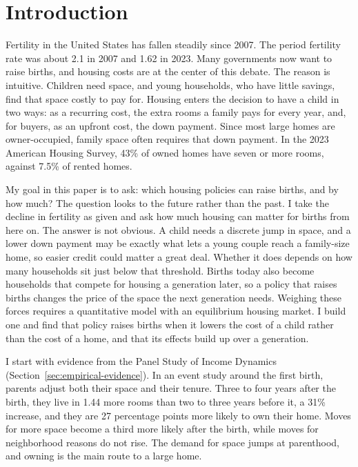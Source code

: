 \section{Introduction}
\label{sec:intro}

Fertility in the United States has fallen steadily since 2007. The period
fertility rate was about 2.1 in 2007 and 1.62 in 2023. Many governments now
want to raise births, and housing costs are at the center of this debate. The
reason is intuitive. Children need space, and young households, who have
little savings, find that space costly to pay for. Housing enters the
decision to have a child in two ways: as a recurring cost, the extra rooms a
family pays for every year, and, for buyers, as an upfront cost, the down
payment. Since most large homes are owner-occupied, family space often
requires that down payment. In the 2023 American Housing Survey, 43\% of
owned homes have seven or more rooms, against 7.5\% of rented homes.

My goal in this paper is to ask: which housing policies can raise births, and
by how much? The question looks to the future rather than the past. I take
the decline in fertility as given and ask how much housing can matter for
births from here on. The answer is not obvious. A child needs a discrete jump
in space, and a lower down payment may be exactly what lets a young couple
reach a family-size home, so easier credit could matter a great deal. Whether
it does depends on how many households sit just below that threshold. Births
today also become households that compete for housing a generation later, so
a policy that raises births changes the price of the space the next
generation needs. Weighing these forces requires a quantitative model with an
equilibrium housing market. I build one and find that policy raises births
when it lowers the cost of a child rather than the cost of a home, and that
its effects build up over a generation.

I start with evidence from the Panel Study of Income Dynamics
(Section~\ref{sec:empirical-evidence}). In an event study around the first
birth, parents adjust both their space and their tenure. Three to four years
after the birth, they live in 1.44 more rooms than two to three years before
it, a 31\% increase, and they are 27 percentage points more likely to own
their home. Moves for more space become a third more likely after the birth,
while moves for neighborhood reasons do not rise. The demand for space jumps
at parenthood, and owning is the main route to a large home.

